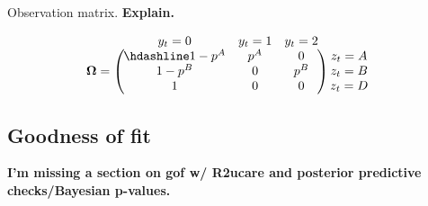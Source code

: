 \documentclass[
  12pt,
]{krantz}
\newenvironment{Shaded}{\begin{snugshade}}{\end{snugshade}}
\newcommand{\FunctionTok}[1]{\textcolor[rgb]{0.13,0.29,0.53}{\textbf{#1}}}
\newcommand{\NormalTok}[1]{#1}
\newcommand{\OtherTok}[1]{\textcolor[rgb]{0.56,0.35,0.01}{#1}}
\newcommand{\SpecialCharTok}[1]{\textcolor[rgb]{0.81,0.36,0.00}{\textbf{#1}}}
\begin{document}
Observation matrix. \textbf{Explain.}

\[
\begin{matrix}
& \\
\mathbf{\Omega} =
    \left ( \vphantom{ \begin{matrix} 12 \\ 12 \\ 12 \end{matrix} } \right .
\end{matrix}
\hspace{-1.2em}
\begin{matrix}
    y_t=0 & y_t=1 & y_t=2 \\ \hdashline
1 - p^A & p^A & 0\\
1 - p^B & 0 & p^B\\
1 & 0 & 0
\end{matrix}
\hspace{-0.2em}
\begin{matrix}
& \\
\left . \vphantom{ \begin{matrix} 12 \\ 12 \\ 12 \end{matrix} } \right )
    \begin{matrix}
    z_{t}=A \\ z_{t}=B \\ z_{t}=D
    \end{matrix}
\end{matrix}
\]

\hypertarget{gofas}{%
\subsection{Goodness of fit}\label{gofas}}

\textbf{I'm missing a section on gof w/ R2ucare and posterior predictive checks/Bayesian p-values.}

\begin{Shaded}
\end{Shaded}
\end{document}
